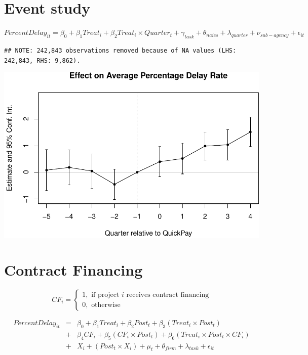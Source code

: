 \documentclass[
]{article}
\begin{document}
\hypertarget{event-study}{%
\section{Event study}\label{event-study}}

\(PercentDelay_{it}=\beta_0 + \beta_1 Treat_i + \beta_2 Treat_i \times Quarter_t + \gamma_{task} + \theta_{naics}+\lambda_{quarter}+\nu_{sub-agency}+\epsilon_{it}\)

\begin{verbatim}
## NOTE: 242,843 observations removed because of NA values (LHS: 242,843, RHS: 9,862).
\end{verbatim}

\includegraphics{qp_first_pc_delay-2_files/figure-latex/event_study-1.pdf}

\hypertarget{contract-financing}{%
\section{Contract Financing}\label{contract-financing}}

\[ CF_i = \begin{cases} 1, \text{ if project } i \text{ receives contract financing}\\
0, \text{ otherwise} \end{cases}\]

\[ \begin{aligned}
PercentDelay_{it} &=& \beta_0+\beta_1 Treat_i + \beta_2 Post_t + \beta_3 (Treat_i \times Post_t) \\
&+&\beta_4 CF_i + \beta_5 (CF_i \times Post_t) + \beta_6 (Treat_i \times Post_t \times CF_i) \\ 
&+&X_i + (Post_t \times X_i) + \mu_t + \theta_{firm} + \lambda_{task}+ \epsilon_{it}
\end{aligned}\]
\end{document}
